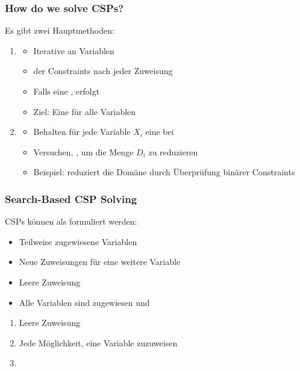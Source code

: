 \subsubsection*{How do we solve CSPs?}
Es gibt zwei Hauptmethoden:
\begin{enumerate}
    \item {}
    \begin{itemize}
        \item Iterative  an Variablen
        \item {} der Constraints nach jeder Zuweisung
        \item Falls eine , erfolgt 
        \item Ziel: Eine  für alle Variablen
    \end{itemize}
    \item {}
    \begin{itemize}
        \item Behalten für jede Variable $X_{i}$ eine  bei
        \item Versuchen, , um die Menge $D_{i}$ zu reduzieren
        \item Beispiel:  reduziert die Domäne durch Überprüfung binärer Constraints
    \end{itemize}
\end{enumerate}
\subsubsection*{Search-Based CSP Solving}
CSPs können als  formuliert werden:
\begin{itemize}
    \item {} Teilweise zugewiesene Variablen
    \item {} Neue Zuweisungen für eine weitere Variable
    \item {} Leere Zuweisung
    \item {} Alle Variablen sind zugewiesen und 
\end{itemize}
\begin{enumerate}
    \item {} Leere Zuweisung
    \item {} Jede Möglichkeit, eine Variable zuzuweisen
    \item {}
\end{enumerate}

